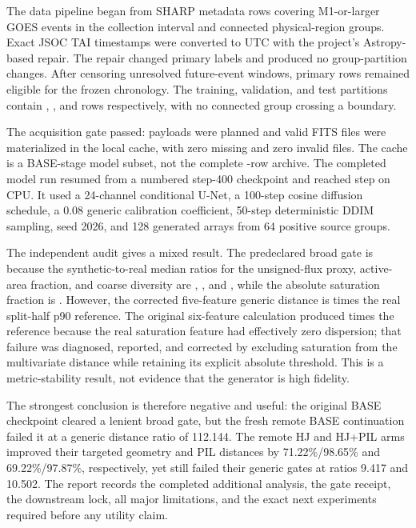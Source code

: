 \documentclass[11pt,oneside]{report}
\begin{document}
The data pipeline began from \ManifestCount{} SHARP metadata rows covering \MOneEvents{} M1-or-larger GOES events in the collection interval and \GroupCount{} connected physical-region groups. Exact JSOC TAI timestamps were converted to UTC with the project’s Astropy-based repair. The repair changed \TaiLabelChanges{} primary labels and produced no group-partition changes. After censoring unresolved future-event windows, \PrimaryCount{} primary rows remained eligible for the frozen chronology. The training, validation, and test partitions contain \TrainRows{}, \ValidationRows{}, and \TestRows{} rows respectively, with no connected group crossing a boundary.

The acquisition gate passed: \PlannedCount{} payloads were planned and \AcquiredCount{} valid FITS files were materialized in the local cache, with zero missing and zero invalid files. The cache is a BASE-stage model subset, not the complete \PrimaryCount{}-row archive. The completed model run resumed from a numbered step-400 checkpoint and reached step \BaseSteps{} on CPU. It used a 24-channel conditional U-Net, a 100-step cosine diffusion schedule, a 0.08 generic calibration coefficient, 50-step deterministic DDIM sampling, seed 2026, and 128 generated arrays from 64 positive source groups.

The independent audit gives a mixed result. The predeclared broad gate is \AuditGate{} because the synthetic-to-real median ratios for the unsigned-flux proxy, active-area fraction, and coarse diversity are \AuditFluxRatio{}, \AuditAreaRatio{}, and \AuditDiversityRatio{}, while the absolute saturation fraction is \AuditSatFraction{}. However, the corrected five-feature generic distance is \AuditDistanceRatio{} times the real split-half p90 reference. The original six-feature calculation produced \AuditOriginalDistanceRatio{} times the reference because the real saturation feature had effectively zero dispersion; that failure was diagnosed, reported, and corrected by excluding saturation from the multivariate distance while retaining its explicit absolute threshold. This is a metric-stability result, not evidence that the generator is high fidelity.

The strongest conclusion is therefore negative and useful: the original BASE checkpoint cleared a lenient broad gate, but the fresh remote BASE continuation failed it at a generic distance ratio of 112.144. The remote HJ and HJ+PIL arms improved their targeted geometry and PIL distances by 71.22\%/98.65\% and 69.22\%/97.87\%, respectively, yet still failed their generic gates at ratios 9.417 and 10.502. The report records the completed additional analysis, the gate receipt, the downstream lock, all major limitations, and the exact next experiments required before any utility claim.
\end{document}
